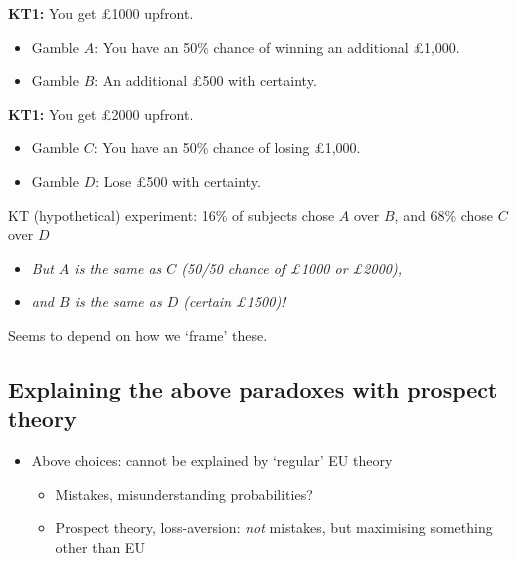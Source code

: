 \documentclass[]{article}
\providecommand{\tightlist}{%
  \setlength{\itemsep}{0pt}\setlength{\parskip}{0pt}}
\begin{document}
\hrulefill

\textbf{KT1:} You get \pounds1000 upfront.\\

\begin{itemize}
\item
  Gamble \(A\): You have an 50\% chance of winning an additional \pounds1,000.
\item
  Gamble \(B\): An additional \pounds500 with certainty.
\end{itemize}

\hrulefill

\textbf{KT1:} You get \pounds2000 upfront.\\

\begin{itemize}
\item
  Gamble \(C\): You have an 50\% chance of losing \pounds1,000.
\item
  Gamble \(D\): Lose \pounds500 with certainty.
\end{itemize}

\bigskip

\hrulefill

KT (hypothetical) experiment: 16\% of subjects chose \(A\) over \(B\), and 68\% chose \(C\) over \(D\)

\begin{itemize}
\tightlist
\item
  \emph{But \(A\) is the same as \(C\) (50/50 chance of \pounds1000 or \pounds2000),}
\item
  \emph{and \(B\) is the same as \(D\) (certain \pounds1500)!}
\end{itemize}

Seems to depend on how we `frame' these.

\hypertarget{explaining-the-above-paradoxes-with-prospect-theory}{%
\subsection{Explaining the above paradoxes with prospect theory}\label{explaining-the-above-paradoxes-with-prospect-theory}}

\begin{itemize}
\tightlist
\item
  Above choices: cannot be explained by `regular' EU theory

  \begin{itemize}
  \tightlist
  \item
    Mistakes, misunderstanding probabilities?
  \item
    Prospect theory, loss-aversion: \emph{not} mistakes, but maximising something other than EU
  \end{itemize}
\end{itemize}
\end{document}
